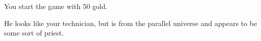 \documentclass[char]{guildcamp3}
\begin{document}
\begin{itemz}[Notes]
	\item You start the game with 50 gold. 
	\end{itemz}
\begin{contacts}
  \contact{\cPaladin{}} He looks like your technician, but is from the parallel universe and appears to be some sort of priest.
\end{contacts}
\end{document}

